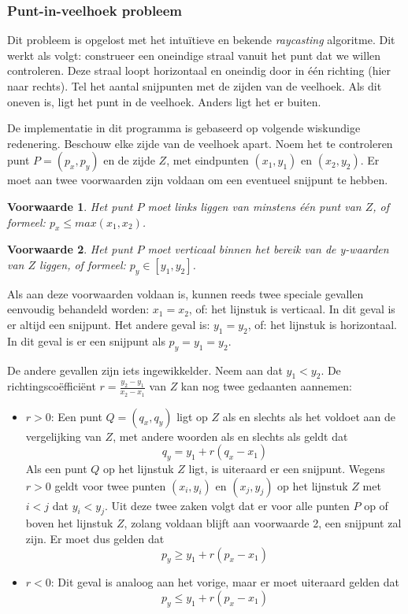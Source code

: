 \documentclass[titlepage,a4paper]{article}
\newtheorem{voorwaarde}{Voorwaarde}
\begin{document}
\subsubsection{Punt-in-veelhoek probleem}
Dit probleem is opgelost met het intu\"itieve en bekende \textit{raycasting} algoritme. Dit werkt als volgt: construeer een oneindige straal vanuit het punt dat we willen controleren. Deze straal loopt horizontaal en oneindig door in \'e\'en richting (hier naar rechts). Tel het aantal snijpunten met de zijden van de veelhoek. Als dit oneven is, ligt het punt in de veelhoek. Anders ligt het er buiten.

De implementatie in dit programma is gebaseerd op volgende wiskundige redenering. Beschouw elke zijde van de veelhoek apart. Noem het te controleren punt $P = (p_x, p_y)$ en de zijde $Z$, met eindpunten $(x_1,y_1)$ en $(x_2,y_2)$. Er moet aan twee voorwaarden zijn voldaan om een eventueel snijpunt te hebben.

\begin{voorwaarde}Het punt $P$ moet links liggen van minstens \'e\'en punt van $Z$, of formeel: $p_x \leq max(x_1,x_2)$.
\end{voorwaarde}
\begin{voorwaarde}Het punt $P$ moet verticaal binnen het bereik van de y-waarden van $Z$ liggen, of formeel: $p_y \in [y_1,y_2]$.
\end{voorwaarde}
Als aan deze voorwaarden voldaan is, kunnen reeds twee speciale gevallen eenvoudig behandeld worden: $x_1 = x_2$, of: het lijnstuk is verticaal. In dit geval is er altijd een snijpunt. Het andere geval is: $y_1 = y_2$, of: het lijnstuk is horizontaal. In dit geval is er een snijpunt als $p_y = y_1 = y_2$.

De andere gevallen zijn iets ingewikkelder. Neem aan dat $y_1 < y_2$. De richtingsco\"effici\"ent $r = \frac{y_2 - y_1}{x_2 - x_1}$ van $Z$ kan nog twee gedaanten aannemen:

\begin{itemize}
\item $r > 0$: Een punt $Q = (q_x,q_y)$ ligt op $Z$ als en slechts als het voldoet aan de vergelijking van $Z$, met andere woorden als en slechts als geldt dat
\begin{equation}
q_y = y_1 + r(q_x-x_1)
\end{equation}
Als een punt $Q$ op het lijnstuk $Z$ ligt, is uiteraard er een snijpunt.
Wegens $r > 0$ geldt voor twee punten $(x_i,y_i)$ en $(x_j,y_j)$ op het lijnstuk $Z$ met $i < j$ dat $y_i < y_j$. Uit deze twee zaken volgt dat er voor alle punten $P$ op of boven het lijnstuk $Z$, zolang voldaan blijft aan voorwaarde 2, een snijpunt zal zijn. Er moet dus gelden dat
\begin{equation}
p_y \geq y_1 + r(p_x-x_1)
\end{equation}
\item $r < 0$: Dit geval is analoog aan het vorige, maar er moet uiteraard gelden dat
\begin{equation}
p_y \leq y_1 + r(p_x-x_1)
\end{equation}
\end{itemize}
\end{document}
